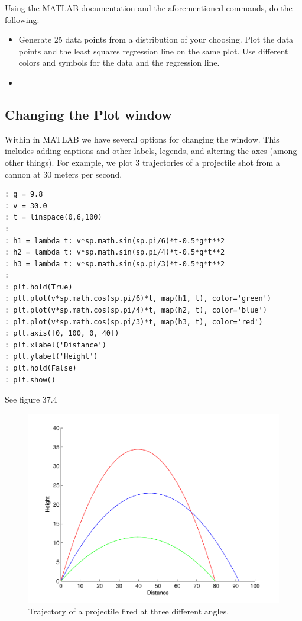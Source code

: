\begin{problem}  Using the MATLAB documentation and the aforementioned commands, do the following:
\begin{itemize}
\item Generate 25 data points from a distribution of your choosing.  Plot the data points and the least squares regression line on the same plot.  Use different colors and symbols for the data and the regression line.
\item 
\end{itemize}
\end{problem}

\subsection{Changing the Plot window}

Within in MATLAB we have several options for changing the  window.  This includes adding captions and other labels, legends, and altering the axes (among other things).  For example, we plot 3 trajectories of a projectile shot from a cannon at 30 meters per second.

\begin{lstlisting}[style=python]
: g = 9.8
: v = 30.0
: t = linspace(0,6,100)
:
: h1 = lambda t: v*sp.math.sin(sp.pi/6)*t-0.5*g*t**2
: h2 = lambda t: v*sp.math.sin(sp.pi/4)*t-0.5*g*t**2
: h3 = lambda t: v*sp.math.sin(sp.pi/3)*t-0.5*g*t**2
:
: plt.hold(True)
: plt.plot(v*sp.math.cos(sp.pi/6)*t, map(h1, t), color='green')
: plt.plot(v*sp.math.cos(sp.pi/4)*t, map(h2, t), color='blue')
: plt.plot(v*sp.math.cos(sp.pi/3)*t, map(h3, t), color='red')
: plt.axis([0, 100, 0, 40])
: plt.xlabel('Distance')
: plt.ylabel('Height')
: plt.hold(False)
: plt.show()
\end{lstlisting}

See figure 37.4

\begin{figure}
\begin{center}
\includegraphics[scale=0.5]{./FiguresMAT/plot4}
\caption{Trajectory of a projectile fired at three different angles.}
\end{center}
\end{figure}

